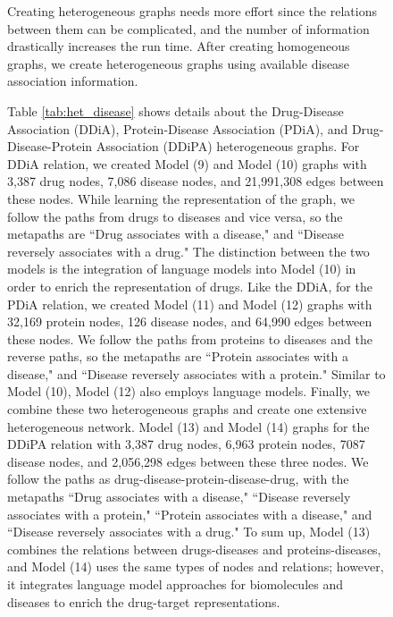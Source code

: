 \begin{figure}[h]

Creating heterogeneous graphs needs more effort since the relations between them can be complicated, and the number of information drastically increases the run time. After creating homogeneous graphs, we create heterogeneous graphs using available disease association information. 

\newpage
Table \ref{tab:het_disease} shows details about the Drug-Disease Association (DDiA), Protein-Disease Association (PDiA), and Drug-Disease-Protein Association (DDiPA) heterogeneous graphs. For DDiA relation, we created Model (9) and Model (10) graphs with 3,387 drug nodes, 7,086 disease nodes, and 21,991,308 edges between these nodes. While learning the representation of the graph, we follow the paths from drugs to diseases and vice versa, so the metapaths are ``Drug associates with a disease," and ``Disease reversely associates with a drug." The distinction between the two models is the integration of language models into Model (10) in order to enrich the representation of drugs. Like the DDiA, for the PDiA relation, we created Model (11) and Model (12) graphs with 32,169 protein nodes, 126 disease nodes, and 64,990 edges between these nodes. We follow the paths from proteins to diseases and the reverse paths, so the metapaths are ``Protein associates with a disease," and ``Disease reversely associates with a protein." Similar to Model (10), Model (12) also employs language models. Finally, we combine these two heterogeneous graphs and create one extensive heterogeneous network. Model (13) and Model (14) graphs for the DDiPA relation with 3,387 drug nodes, 6,963 protein nodes, 7087 disease nodes, and 2,056,298 edges between these three nodes. We follow the paths as drug-disease-protein-disease-drug, with the metapaths ``Drug associates with a disease," ``Disease reversely associates with a protein," ``Protein associates with a disease," and ``Disease reversely associates with a drug." To sum up, Model (13) combines the relations between drugs-diseases and proteins-diseases, and Model (14) uses the same types of nodes and relations; however, it integrates language model approaches for biomolecules and diseases to enrich the drug-target representations. 


\end{figure}
